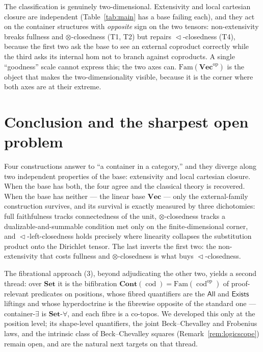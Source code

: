 \documentclass[11pt]{amsart}
\theoremstyle{plain}
\theoremstyle{definition}
\theoremstyle{remark}
\newcommand{\Set}{\mathbf{Set}}
\newcommand{\Vect}{\mathbf{Vec}}
\newcommand{\Fam}{\mathrm{Fam}}
\newcommand{\Cont}{\mathbf{Cont}}
\renewcommand{\lhd}{\vartriangleleft}
\newcommand{\op}{\mathrm{op}}
\DeclareMathOperator{\cod}{cod}
\newcommand{\Exists}{\mathsf{Exists}}
\newcommand{\All}{\mathsf{All}}
\begin{document}
The classification is genuinely two-dimensional. Extensivity and local cartesian closure are
independent (Table~\ref{tab:main} has a base failing each), and they act on the container structures
with \emph{opposite} sign on the two tensors: non-extensivity breaks fullness and
$\otimes$-closedness (T1, T2) but repairs $\lhd$-closedness (T4), because the first two ask the base
to see an external coproduct correctly while the third asks its internal hom not to branch against
coproducts. A single ``goodness'' scale cannot express this; the two axes can. $\Fam(\Vect^\op)$ is
the object that makes the two-dimensionality visible, because it is the corner where both axes are at
their extreme.

\section{Conclusion and the sharpest open problem}\label{sec:conclusion}

Four constructions answer to ``a container in a category,'' and they diverge along two independent
properties of the base: extensivity and local cartesian closure. When the base has both, the four
agree and the classical theory is recovered. When the base has neither --- the linear base $\Vect$
--- only the external-family construction survives, and its survival is exactly measured by three
dichotomies: full faithfulness tracks connectedness of the unit, $\otimes$-closedness tracks a
dualizable-and-summable condition met only on the finite-dimensional corner, and $\lhd$-left-closedness
holds precisely where linearity collapses the substitution product onto the Dirichlet tensor. The last
inverts the first two: the non-extensivity that costs fullness and $\otimes$-closedness is what buys
$\lhd$-closedness.

The fibrational approach (3), beyond adjudicating the other two, yields a second thread: over $\Set$
it is the bifibration $\Cont(\cod)=\Fam(\cod^\op)$ of proof-relevant predicates on positions, whose
fibred quantifiers are the $\All$ and $\Exists$ liftings and whose hyperdoctrine is the fibrewise
opposite of the standard one --- container-$\exists$ is $\Set$-$\forall$, and each fibre is a co-topos.
We developed this only at the position level; its shape-level quantifiers, the joint Beck--Chevalley
and Frobenius laws, and the intrinsic class of Beck--Chevalley squares (Remark~\ref{rem:logicscope})
remain open, and are the natural next targets on that thread.
\end{document}

